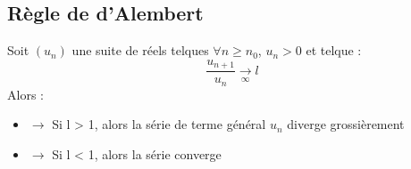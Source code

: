 \subsection{Règle de d'Alembert}
Soit $(u_n)$ une suite de réels telques $\forall n \geq n_0$, $u_n>0$ et telque : 
$$\dfrac{u_{n+1}}{u_n} \underset{\infty}\rightarrow l$$
Alors :
\begin{itemize}
 \item{$\rightarrow$} Si l > 1, alors la série de terme général $u_n$ diverge grossièrement
 \item{$\rightarrow$} Si l < 1, alors la série converge
\end{itemize}